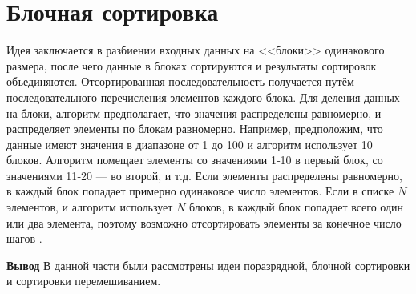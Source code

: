 \section{Блочная сортировка}
Идея заключается в  разбиении входных данных на <<блоки>> одинакового размера, после чего данные в блоках сортируются и результаты сортировок объединяются.
Отсортированная последовательность получается путём последовательного перечисления элементов каждого блока.
Для деления данных на блоки, алгоритм предполагает, что значения  распределены равномерно, и распределяет элементы по блокам равномерно. Например, предположим, что данные имеют значения в диапазоне от 1 до 100 и алгоритм использует 10 блоков. Алгоритм помещает элементы со значениями 1‑10 в первый блок, со значениями 11‑20 — во второй, и т.д.
Если элементы распределены равномерно, в каждый блок попадает примерно одинаковое число элементов. Если в списке $N$ элементов, и алгоритм использует $N$ блоков, в каждый блок попадает всего один или два элемента, поэтому возможно отсортировать элементы за конечное число шагов \cite{article_sorts}.






\textbf{Вывод}
В данной части были рассмотрены идеи поразрядной, блочной сортировки и сортировки перемешиванием.
